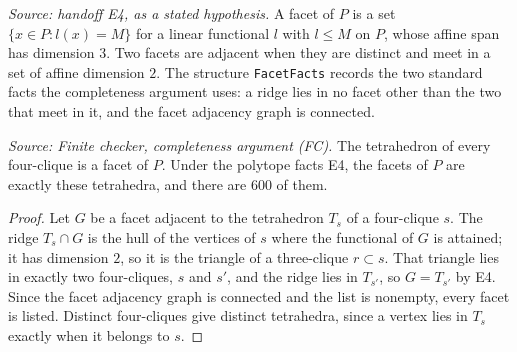 \begin{definition}
  \label{def:facet-facts}
  \leanok
  \textit{Source: handoff E4, as a stated hypothesis.}
  A facet of \(P\) is a set \(\{x\in P: l(x)=M\}\) for a linear functional
  \(l\) with \(l\le M\) on \(P\), whose affine span has dimension \(3\).
  Two facets are adjacent when they are distinct and meet in a set of
  affine dimension \(2\). The structure \texttt{FacetFacts} records the two
  standard facts the completeness argument uses: a ridge lies in no facet
  other than the two that meet in it, and the facet adjacency graph is
  connected.
\end{definition}

\begin{theorem}
  \label{thm:facet-completeness}
  \leanok
  \textit{Source: Finite checker, completeness argument (FC).}
  The tetrahedron of every four-clique is a facet of \(P\). Under the
  polytope facts E4, the facets of \(P\) are exactly these tetrahedra, and
  there are \(600\) of them.
\end{theorem}
\begin{proof}
  \leanok
  Let \(G\) be a facet adjacent to the tetrahedron \(T_s\) of a
  four-clique \(s\). The ridge \(T_s\cap G\) is the hull of the vertices of
  \(s\) where the functional of \(G\) is attained; it has dimension \(2\),
  so it is the triangle of a three-clique \(r\subset s\). That triangle
  lies in exactly two four-cliques, \(s\) and \(s'\), and the ridge lies in
  \(T_{s'}\), so \(G=T_{s'}\) by E4. Since the facet adjacency graph is
  connected and the list is nonempty, every facet is listed. Distinct
  four-cliques give distinct tetrahedra, since a vertex lies in \(T_s\)
  exactly when it belongs to \(s\).
\end{proof}
